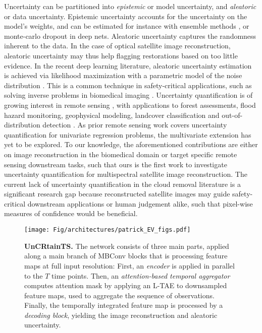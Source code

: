 \documentclass[10pt,twocolumn,letterpaper]{article}
\let\oldtextbf\textbf
\renewcommand{\textbf}[1]{\oldtextbf{\boldmath #1}}
\begin{document}
Uncertainty can be partitioned into \emph{epistemic} or model uncertainty, and \emph{aleatoric} or data uncertainty. Epistemic uncertainty accounts for the uncertainty on the model's weights, and can be estimated for instance with ensemble methods \cite{lakshminarayanan2017simple, turkoglu2022filmensemble}, or monte-carlo dropout \cite{gal2016dropout} in deep nets. 
Aleatoric uncertainty captures the randomness inherent to the data. In the case of optical satellite image reconstruction, aleatoric uncertainty may thus help flagging restorations based on too little evidence. 
In the recent deep learning literature, aleatoric uncertainty estimation is achieved via likelihood maximization with a parametric model of the noise distribution \cite{takahashi2018student, skafte2019reliable, seitzer2021pitfalls, ansariautoinverse, stirn2022faithful}. This is a common technique in safety-critical applications, such as solving inverse problems in biomedical imaging \cite{bhadra2021hallucinations, edupuganti2020uncertainty, laves2020uncertainty, laves2020well, tolle2021mean, antoran2022bayesdip, chung2022mr, glaubitz2023generalized}.
Uncertainty quantification is of growing interest in remote sensing \cite{gawlikowski2021survey}, with applications to forest assessments, flood hazard monitoring, geophysical modeling, landcover classification and out-of-distribution detection \cite{lang2022global, lang2022high, chaudhary2022flood, liu2022uncertainty, gawlikowski2022robust, gawlikowski2022advanced}. 
As prior remote sensing work covers uncertainty quantification for univariate regression problems, the multivariate extension has yet to be explored. 
To our knowledge, the aforementioned contributions are either on image reconstruction in the biomedical domain or target specific remote sensing downstream tasks, such that ours is the first work to investigate uncertainty quantification for multispectral satellite image reconstruction. 
The current lack of uncertainty quantification in the cloud removal literature is a significant research gap because reconstructed satellite images may guide safety-critical downstream applications or human judgement alike, such that pixel-wise measures of confidence would be beneficial. 


\begin{figure*}[ht!]
    \texttt{[image: Fig/architectures/patrick\_EV\_figs.pdf]}
    \caption{ \textbf{UnCRtainTS.}
    The network consists of three main parts, applied along a main branch of 
    MBConv blocks \cite{sandler2018mobilenetv2} that is processing feature maps at full input resolution: First, an \textit{encoder} is applied in parallel to the $T$ time points. Then, an \textit{attention-based temporal aggregator} computes attention mask by applying an L-TAE to downsampled feature maps, used to aggregate the sequence of observations. Finally, the temporally integrated feature map is processed by a \textit{decoding block}, yielding the image reconstruction and aleatoric uncertainty.
    }
    \label{fig:architecture_uncrtaints}
\end{figure*}
\end{document}
